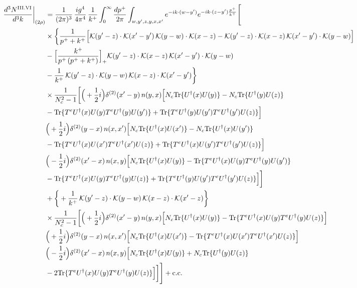 \documentclass[9pt]{article}
\numberwithin{equation}{section}
\begin{document}
\begin{align}
\frac{d^{3}N^{\rm III.VI}}{d^{3}k}\bigg|_{(2\rho)}&=\frac{1}{(2\pi)^{3}}\,\frac{ig^{4}}{4\pi^{4}}\,\frac{1}{k^{+}}\int_{0}^{\infty}\frac{dp^{+}}{2\pi}\int_{w,y',z,y,x,x'}e^{-ik\cdot(w-y')}e^{-ik\cdot(z-y')\frac{p^{+}}{k^{+}}}\Bigg[\notag\\
&\times\bigg\{\frac{1}{p^{+}+k^{+}}\Big[\mathcal{K}(y'-z)\cdot\mathcal{K}(x'-y')\,\mathcal{K}(y-w)\cdot\mathcal{K}(x-z)-\mathcal{K}(y'-z)\cdot\mathcal{K}(x-z)\,\mathcal{K}(x'-y')\cdot\mathcal{K}(y-w)\Big]\notag\\
&-\Big[\frac{k^{+}}{p^{+}\,(p^{+}+k^{+})}\Big]_{+}\mathcal{K}(y'-z)\cdot\mathcal{K}(x-z)\,\mathcal{K}(x'-y')\cdot\mathcal{K}(y-w)\notag\\
&-\frac{1}{k^{+}}\,\mathcal{K}(y'-z)\cdot\mathcal{K}(y-w)\,\mathcal{K}(x-z)\cdot\mathcal{K}(x'-y')\bigg\}\notag\\
&\times \frac{1}{N_{c}^{2}-1}\bigg[\Big(+\frac{1}{2}i\Big)\delta^{(2)}(x'-y)\,n(y,x)\Big[N_{c}{\rm Tr}\{U^{\dagger}(x)U(y)\}-N_{c}{\rm Tr}\{U^{\dagger}(y)U(z)\}\notag\\
& -{\rm Tr}\{T^{e}U^{\dagger}(x)U(y)T^{e}U^{\dagger}(y)U(y')\}+{\rm Tr}\{T^{e}U^{\dagger}(y)U(y')T^{e}U^{\dagger}(y')U(z)\}\Big]\notag\\
& \Big(+\frac{1}{2}i\Big)\delta^{(2)}(y-x)\,n(x,x')\Big[N_{c}{\rm Tr}\{U^{\dagger}(x)U(x')\}-N_{c}{\rm Tr}\{U^{\dagger}(x)U(y')\}\notag\\
& -{\rm Tr}\{T^{e}U^{\dagger}(x)U(x')T^{e}U^{\dagger}(x')U(z)\}+{\rm Tr}\{T^{e}U^{\dagger}(x)U(y')T^{e}U^{\dagger}(y')U(z)\}\Big]\notag\\
& \Big(-\frac{1}{2}i\Big)\delta^{(2)}(x'-x)\,n(x,y)\Big[N_{c}{\rm Tr}\{U^{\dagger}(x)U(y)\}-{\rm Tr}\{T^{e}U^{\dagger}(x)U(y)T^{e}U^{\dagger}(y)U(y')\}\notag\\
& -{\rm Tr}\{T^{e}U^{\dagger}(x)U(y)T^{e}U^{\dagger}(y)U(z)\}+{\rm Tr}\{T^{e}U^{\dagger}(y)U(y')T^{e}U^{\dagger}(y')U(z)\}\Big]\bigg]\notag\\
&+\bigg\{+\frac{1}{k^{+}}\,\mathcal{K}(y'-z)\cdot\mathcal{K}(y-w)\,\mathcal{K}(x-z)\cdot\mathcal{K}(x'-z)\bigg\}\notag\\
&\times \frac{1}{N_{c}^{2}-1}\bigg[\Big(+\frac{1}{2}i\Big)\delta^{(2)}(x'-y)\,n(y,x)\Big[N_{c}{\rm Tr}\{U^{\dagger}(x)U(y)\}-{\rm Tr}\{T^{e}U^{\dagger}(x)U(y)T^{e}U^{\dagger}(y)U(z)\}\Big]\notag\\
& \Big(+\frac{1}{2}i\Big)\delta^{(2)}(y-x)\,n(x,x')\Big[N_{c}{\rm Tr}\{U^{\dagger}(x)U(x')\}-{\rm Tr}\{T^{e}U^{\dagger}(x)U(x')T^{e}U^{\dagger}(x')U(z)\}\Big]\notag\\
& \Big(-\frac{1}{2}i\Big)\delta^{(2)}(x'-x)\,n(x,y)\Big[N_{c}{\rm Tr}\{U^{\dagger}(x)U(y)\}+N_{c}{\rm Tr}\{U^{\dagger}(y)U(z)\}\notag\\
& -2{\rm Tr}\{T^{e}U^{\dagger}(x)U(y)T^{e}U^{\dagger}(y)U(z)\}\Big]\bigg]\Bigg]+{\rm c.c.}\label{eq:E-III.VI-2}
\end{align}
\end{document}
